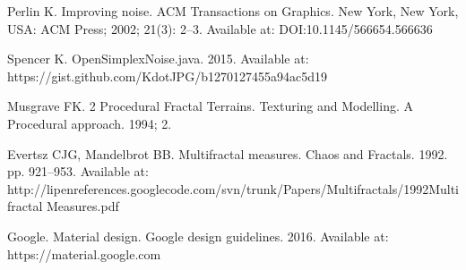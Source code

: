 Perlin K. Improving noise. ACM Transactions on Graphics. New York, New York, USA: ACM Press; 2002; 21(3): 2--3. Available at: DOI:10.1145/566654.566636

Spencer K. OpenSimplexNoise.java. 2015. Available at: https://gist.github.com/KdotJPG/b1270127455a94ac5d19

Musgrave FK. 2 Procedural Fractal Terrains. Texturing and Modelling. A Procedural approach. 1994;  2.

Evertsz CJG, Mandelbrot BB. Multifractal measures. Chaos and Fractals. 1992. pp. 921--953. Available at: http://lipenreferences.googlecode.com/svn/trunk/Papers/Multifractals/1992Multifractal Measures.pdf

Google. Material design. Google design guidelines. 2016. Available at: https://material.google.com

